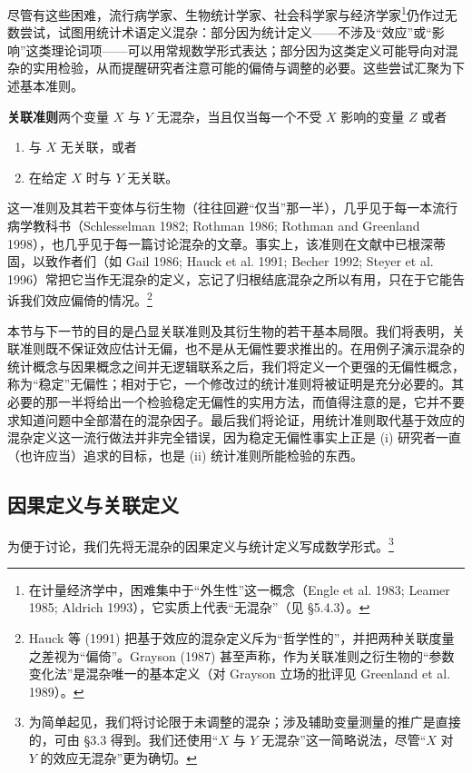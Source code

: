 尽管有这些困难，流行病学家、生物统计学家、社会科学家与经济学家\footnote{在计量经济学中，困难集中于“外生性”这一概念（Engle et al. 1983; Leamer 1985; Aldrich 1993），它实质上代表“无混杂”（见 \S 5.4.3）。}仍作过无数尝试，试图用统计术语定义混杂：部分因为统计定义——不涉及“效应”或“影响”这类理论词项——可以用常规数学形式表达；部分因为这类定义可能导向对混杂的实用检验，从而提醒研究者注意可能的偏倚与调整的必要。这些尝试汇聚为下述基本准则。

\medskip
\noindent\textbf{关联准则}\quad 两个变量 $X$ 与 $Y$ 无混杂，当且仅当每一个不受 $X$ 影响的变量 $Z$ 或者
\begin{enumerate}[label=(\textup{U}\textsubscript{\arabic*}),leftmargin=3.0em]
\item 与 $X$ 无关联，或者
\item 在给定 $X$ 时与 $Y$ 无关联。
\end{enumerate}

这一准则及其若干变体与衍生物（往往回避“仅当”那一半），几乎见于每一本流行病学教科书（Schlesselman 1982; Rothman 1986; Rothman and Greenland 1998），也几乎见于每一篇讨论混杂的文章。事实上，该准则在文献中已根深蒂固，以致作者们（如 Gail 1986; Hauck et al. 1991; Becher 1992; Steyer et al. 1996）常把它当作无混杂的定义，忘记了归根结底混杂之所以有用，只在于它能告诉我们效应偏倚的情况。\footnote{Hauck 等 (1991) 把基于效应的混杂定义斥为“哲学性的”，并把两种关联度量之差视为“偏倚”。Grayson (1987) 甚至声称，作为关联准则之衍生物的“参数变化法”是混杂唯一的基本定义（对 Grayson 立场的批评见 Greenland et al. 1989）。}

本节与下一节的目的是凸显关联准则及其衍生物的若干基本局限。我们将表明，关联准则既不保证效应估计无偏，也不是从无偏性要求推出的。在用例子演示混杂的统计概念与因果概念之间并无逻辑联系之后，我们将定义一个更强的无偏性概念，称为“稳定”无偏性；相对于它，一个修改过的统计准则将被证明是充分必要的。其必要的那一半将给出一个检验稳定无偏性的实用方法，而值得注意的是，它并不要求知道问题中全部潜在的混杂因子。最后我们将论证，用统计准则取代基于效应的混杂定义这一流行做法并非完全错误，因为稳定无偏性事实上正是 (i) 研究者一直（也许应当）追求的目标，也是 (ii) 统计准则所能检验的东西。

\subsection{因果定义与关联定义}

为便于讨论，我们先将无混杂的因果定义与统计定义写成数学形式。\footnote{为简单起见，我们将讨论限于未调整的混杂；涉及辅助变量测量的推广是直接的，可由 \S 3.3 得到。我们还使用“$X$ 与 $Y$ 无混杂”这一简略说法，尽管“$X$ 对 $Y$ 的效应无混杂”更为确切。}

